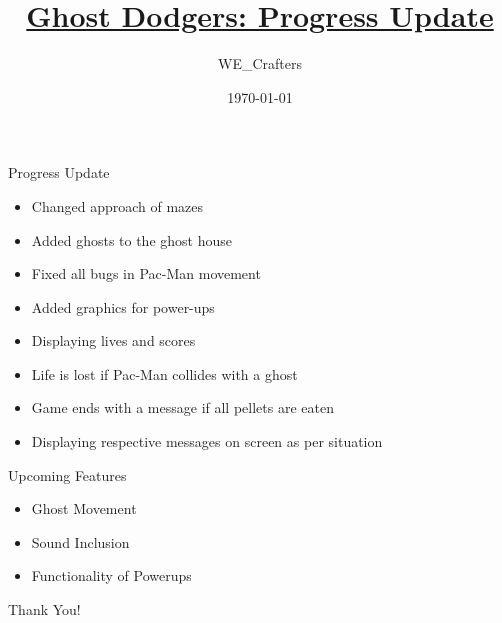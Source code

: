 \documentclass{beamer}
\title{\href{https://gitlab.com/we_crafters/ghost-dodgers}{Ghost Dodgers: Progress Update}}
\author{WE\_Crafters}
\date{\today}
\begin{document}
\frame{\titlepage}

\begin{frame}{Progress Update}
\begin{itemize}
    \item Changed approach of mazes
    \item Added ghosts to the ghost house
    \item Fixed all bugs in Pac-Man movement
    \item Added graphics for power-ups
    \item Displaying lives and scores
    \item Life is lost if Pac-Man collides with a ghost
    \item Game ends with a message if all pellets are eaten
    \item Displaying respective messages on screen as per situation
\end{itemize}
\end{frame}

\begin{frame}{Upcoming Features}
\begin{itemize}
    \item Ghost Movement
    \item Sound Inclusion
    \item Functionality of Powerups
\end{itemize}
\end{frame}

\begin{frame}
    \centering
    \vfill
    \Huge Thank You!
    \vfill
\end{frame}
\end{document}
